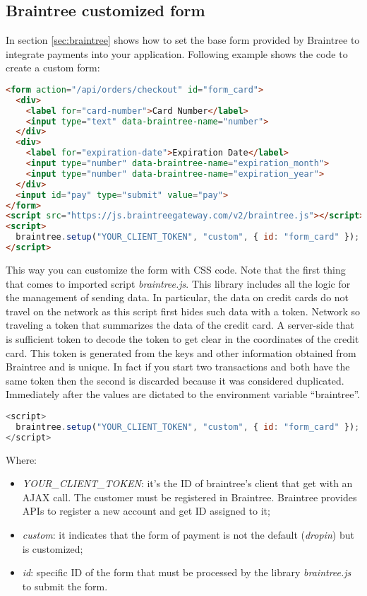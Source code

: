 \subsection{Braintree customized form}
In section \ref{sec:braintree} shows how to set the base form provided by Braintree to integrate payments into your application. Following example shows the code to create a custom form:
\begin{lstlisting}[language=html]
<form action="/api/orders/checkout" id="form_card">
  <div>
    <label for="card-number">Card Number</label>
    <input type="text" data-braintree-name="number">
  </div>
  <div>
    <label for="expiration-date">Expiration Date</label>
    <input type="number" data-braintree-name="expiration_month">
    <input type="number" data-braintree-name="expiration_year">
  </div>
  <input id="pay" type="submit" value="pay">
</form>
<script src="https://js.braintreegateway.com/v2/braintree.js"></script>
<script>
  braintree.setup("YOUR_CLIENT_TOKEN", "custom", { id: "form_card" });
</script>
\end{lstlisting}
This way you can customize the form with CSS code.
Note that the first thing that comes to imported script \emph{braintree.js}.
This library includes all the logic for the management of sending data. In particular, the data on credit cards do not travel on the network as this script first hides such data with a token. Network so traveling a token that summarizes the data of the credit card. A server-side that is sufficient token to decode the token to get clear in the coordinates of the credit card. This token is generated from the keys and other information obtained from Braintree and is unique. In fact if you start two transactions and both have the same token then the second is discarded because it was considered duplicated.
Immediately after the values are dictated to the environment variable “braintree”.
\begin{lstlisting}[language=javascript]
<script>
  braintree.setup("YOUR_CLIENT_TOKEN", "custom", { id: "form_card" });
</script>
\end{lstlisting}
Where:
\begin{itemize}
\item \emph{YOUR\_CLIENT\_TOKEN}: it's the ID of braintree's client that get with an AJAX call. The customer must be registered in Braintree.
Braintree provides APIs to register a new account and get ID assigned to it;
\item \emph{custom}: it indicates that the form of payment is not the default (\emph{dropin}) but is customized;
\item \emph{id}: specific ID of the form that must be processed by the library \emph{braintree.js} to submit the form.
\end{itemize}
